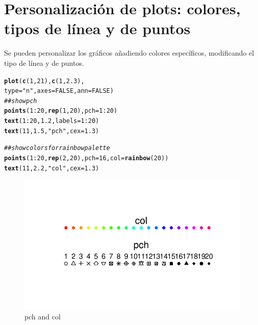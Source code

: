 \documentclass{config/apuntes}\usepackage[]{graphicx}\usepackage[]{xcolor}
\makeatletter
\def\maxwidth{ %
  \ifdim\Gin@nat@width>\linewidth
    \linewidth
  \else
    \Gin@nat@width
  \fi
}
\newcommand{\hlnum}[1]{\textcolor[rgb]{0.686,0.059,0.569}{#1}}%
\newcommand{\hlsng}[1]{\textcolor[rgb]{0.192,0.494,0.8}{#1}}%
\newcommand{\hlcom}[1]{\textcolor[rgb]{0.678,0.584,0.686}{\textit{#1}}}%
\newcommand{\hlopt}[1]{\textcolor[rgb]{0,0,0}{#1}}%
\newcommand{\hldef}[1]{\textcolor[rgb]{0.345,0.345,0.345}{#1}}%
\newcommand{\hlkwc}[1]{\textcolor[rgb]{0.333,0.667,0.333}{#1}}%
\newcommand{\hlkwd}[1]{\textcolor[rgb]{0.737,0.353,0.396}{\textbf{#1}}}%
\newenvironment{kframe}{%
 \def\at@end@of@kframe{}%
 \ifinner\ifhmode%
  \def\at@end@of@kframe{\end{minipage}}%
  \begin{minipage}{\columnwidth}%
 \fi\fi%
 \def\FrameCommand##1{\hskip\@totalleftmargin \hskip-\fboxsep
 \colorbox{shadecolor}{##1}\hskip-\fboxsep
     \hskip-\linewidth \hskip-\@totalleftmargin \hskip\columnwidth}%
 \MakeFramed {\advance\hsize-\width
   \@totalleftmargin\z@ \linewidth\hsize
   \@setminipage}}%
 {\par\unskip\endMakeFramed%
 \at@end@of@kframe}
\newenvironment{knitrout}{}{} %
\makeatother
\begin{document}
\section{Personalización de plots: colores, tipos de línea y de puntos}
Se pueden personalizar los gráficos añadiendo colores específicos, modificando el tipo de línea y de puntos.
\begin{knitrout}
\color{fgcolor}\begin{kframe}
\begin{alltt}
\hlkwd{plot}\hldef{(}\hlkwd{c}\hldef{(}\hlnum{1}\hldef{,} \hlnum{21}\hldef{),} \hlkwd{c}\hldef{(}\hlnum{1}\hldef{,} \hlnum{2.3}\hldef{),}
     \hlkwc{type} \hldef{=} \hlsng{"n"}\hldef{,} \hlkwc{axes} \hldef{=} \hlnum{FALSE}\hldef{,} \hlkwc{ann} \hldef{=} \hlnum{FALSE}\hldef{)}
\hlcom{## show pch}
\hlkwd{points}\hldef{(}\hlnum{1}\hlopt{:}\hlnum{20}\hldef{,} \hlkwd{rep}\hldef{(}\hlnum{1}\hldef{,} \hlnum{20}\hldef{),} \hlkwc{pch} \hldef{=} \hlnum{1}\hlopt{:}\hlnum{20}\hldef{)}
\hlkwd{text}\hldef{(}\hlnum{1}\hlopt{:}\hlnum{20}\hldef{,} \hlnum{1.2}\hldef{,} \hlkwc{labels} \hldef{=} \hlnum{1}\hlopt{:}\hlnum{20}\hldef{)}
\hlkwd{text}\hldef{(}\hlnum{11}\hldef{,} \hlnum{1.5}\hldef{,} \hlsng{"pch"}\hldef{,} \hlkwc{cex} \hldef{=} \hlnum{1.3}\hldef{)}

\hlcom{## show colors for rainbow palette}
\hlkwd{points}\hldef{(}\hlnum{1}\hlopt{:}\hlnum{20}\hldef{,} \hlkwd{rep}\hldef{(}\hlnum{2}\hldef{,} \hlnum{20}\hldef{),} \hlkwc{pch} \hldef{=} \hlnum{16}\hldef{,} \hlkwc{col} \hldef{=} \hlkwd{rainbow}\hldef{(}\hlnum{20}\hldef{))}
\hlkwd{text}\hldef{(}\hlnum{11}\hldef{,} \hlnum{2.2}\hldef{,} \hlsng{"col"}\hldef{,} \hlkwc{cex} \hldef{=} \hlnum{1.3}\hldef{)}
\end{alltt}
\end{kframe}\begin{figure}
\includegraphics[width=\maxwidth]{figure/pchcol-1} \caption[pch and col]{pch and col}\label{fig:pchcol}
\end{figure}

\end{knitrout}
\end{document}
